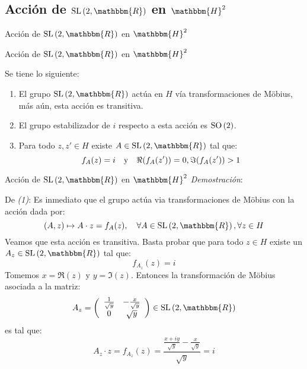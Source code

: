 \documentclass[xcolor=dvipsnames]{beamer}
\theoremstyle{largebreak}
\newcommand{\bbm}[1]{\ensuremath{\mathbbm{#1}}}
\newcommand{\SO}[1]{\ensuremath{\textup{SO}\left(#1\right)}}
\newcommand{\SL}[1]{\ensuremath{\textup{SL}\left(#1\right)}}
\begin{document}
\subsection{Acción de $\SL{2,\bbm{R}}$ en $\bbm{H}^2$}

\begin{frame}
    \begin{center}
        Acción de $\SL{2,\bbm{R}}$ en $\bbm{H}^2$
    \end{center}
\end{frame}

\begin{frame}{Acción de $\SL{2,\bbm{R}}$ en $\bbm{H}^2$}
    \begin{propo}[\textbf{Acción de $\SL{2,\bbm{R}}$ en $H$}]
        \label{accionSL2RenH}
        Se tiene lo siguiente:
        \begin{enumerate}[label = \textit{(\arabic*)}]
            \item El grupo $\SL{2,\bbm{R}}$ actúa en $H$ vía transformaciones de Möbius, más aún, esta acción es transitiva.
            \item El grupo estabilizador de $i$ respecto a esta acción es $\SO{2}$.
            \item Para todo $z,z'\in H$ existe $A\in\SL{2,\bbm{R}}$ tal que:
            \begin{equation*}
                f_A(z)=i\quad\textup{y}\quad\Re(f_A(z'))=0, \Im(f_A(z'))>1
            \end{equation*}
        \end{enumerate}
    \end{propo}
\end{frame}

\begin{frame}{Acción de $\SL{2,\bbm{R}}$ en $\bbm{H}^2$}
    \textit{Demostración}:

    De \textit{(1)}: Es inmediato que el grupo actúa via transformaciones de Möbius con la acción dada por:
    \begin{equation*}
        (A,z)\mapsto A\cdot z = f_A(z),\quad\forall A\in \SL{2,\bbm{R}},\forall z\in H
    \end{equation*}
    Veamos que esta acción es transitiva. Basta probar que para todo $z\in H$ existe un $A_z\in\SL{2,\bbm{R}}$ tal que:
    \begin{equation*}
        f_{A_z}(z)=i
    \end{equation*}
    Tomemos $x=\Re(z)$ y $y=\Im(z)$. Entonces la transformación de Möbius asociada a la matriz:
    \begin{equation*}
        A_z=\left(
            \begin{array}{cc}
                \frac{1}{\sqrt{y}} & -\frac{x}{\sqrt{y}} \\
                0 & \sqrt{y} \\
            \end{array}
        \right)\in\SL{2,\bbm{R}}
    \end{equation*}
    es tal que:
    \begin{equation*}
        A_z\cdot z=f_{ A_z}(z)=\frac{\frac{x+iy}{\sqrt{y}}-\frac{x}{\sqrt{y}}}{\sqrt{y}}=i
    \end{equation*}
\end{frame}
\end{document}
